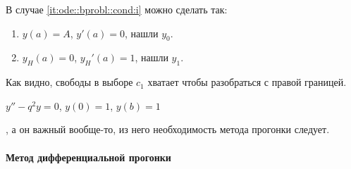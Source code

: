\documentclass{trlnotes}
\begin{document}
В случае \ref{it:ode::bprobl::cond:i} можно сделать так:
\begin{enumerate}
  \item $y(a) = A$, $y'(a) = 0$, нашли $y_0$.
  \item $y_H(a) = 0$, $y_H'(a) = 1$, нашли $y_1$.
\end{enumerate}
Как видно, свободы в выборе $c_1$ хватает чтобы разобраться с правой границей.

\begin{exmp}
  $y'' - q^2 y =0$, $y(0) = 1$, $y(b) = 1$

  \underdev, а он важный вообще-то, из него необходимость метода прогонки следует.
\end{exmp}

\paragraph{Метод дифференциальной прогонки}
\end{document}
